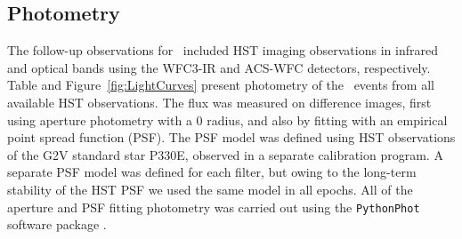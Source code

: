 \subsection{Photometry}\label{sec:Photometry}

The follow-up observations for \spock\ included HST imaging observations in
infrared and optical bands using the WFC3-IR and ACS-WFC detectors,
respectively. Table  %
and Figure~\ref{fig:LightCurves} present 
photometry of the \spock\ events
from all available HST observations. The flux was measured on
difference images, first using aperture photometry with a 0
radius, and also by fitting with an empirical point spread function
(PSF).  The PSF model was defined using HST observations of the G2V
standard star P330E, observed in a separate calibration program.  A
separate PSF model was defined for each filter, but owing to the
long-term stability of the HST PSF we used the same model in all
epochs.  All of the aperture and PSF fitting photometry was carried
out using the {\tt PythonPhot} software package \citep{Jones:2015}.

